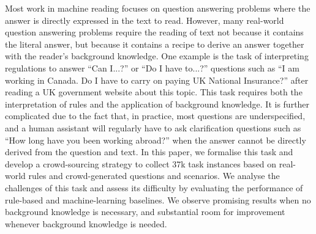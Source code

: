 Most work in machine reading focuses on question answering problems where the answer is directly expressed in the text to read. However, many real-world question answering problems require the reading of text not because it contains the literal answer, but because it contains a recipe to derive an answer together with the reader's background knowledge. One example is the task of interpreting regulations to answer ``Can I...?'' or ``Do I have to...?'' questions such as ``I am working in Canada. Do I have to carry on paying UK National Insurance?'' after reading a UK government website about this topic. This task requires both the interpretation of rules and the application of background knowledge. It is further complicated due to the fact that, in practice, most questions are underspecified, and a human assistant will regularly have to ask clarification questions such as ``How long have you been working abroad?'' when the answer cannot be directly derived from the question and text. In this paper, we formalise this task and develop a crowd-sourcing strategy to collect 37k task instances based on real-world rules and crowd-generated questions and scenarios. We analyse the challenges of this task and assess its difficulty by evaluating the performance of rule-based and machine-learning baselines. We observe promising results when no background knowledge is necessary, and substantial room for improvement whenever background knowledge is needed.
